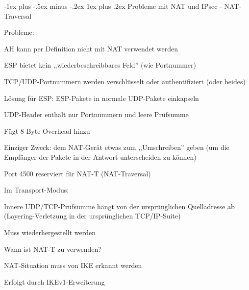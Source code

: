 \documentclass[a4paper]{article}
\makeatletter
\renewcommand{\subsubsection}{\@startsection{subsubsection}{3}{0mm}%
 {-1ex plus -.5ex minus -.2ex}%
 {1ex plus .2ex}%
 {\normalfont\small\bfseries}}
\makeatother
\begin{document}
\begin{multicols}{3}
      \subsubsection{Probleme mit NAT und IPsec - NAT-Traversal}
      \begin{itemize*}
            \item Probleme:
            \begin{itemize*}
                  \item AH kann per Definition nicht mit NAT verwendet werden
                  \item ESP bietet kein ,,wiederbeschreibbares Feld'' (wie Portnummer)
                  \item TCP/UDP-Portnummern werden verschlüsselt oder authentifiziert (oder beides)
            \end{itemize*}
            \item Lösung für ESP: ESP-Pakete in normale UDP-Pakete einkapseln
            \item UDP-Header enthält nur Portnummern und leere Prüfsumme
            \begin{itemize*}
                  \item Fügt 8 Byte Overhead hinzu
                  \item Einziger Zweck: dem NAT-Gerät etwas zum ,,Umschreiben'' geben (um die Empfänger der Pakete in der Antwort unterscheiden zu können)
                  \item Port 4500 reserviert für NAT-T (NAT-Traversal)
            \end{itemize*}
            \item Im Transport-Modus:
            \begin{itemize*}
                  \item Innere UDP/TCP-Prüfsumme hängt von der ursprünglichen Quelladresse ab (Layering-Verletzung in der ursprünglichen TCP/IP-Suite)
                  \item Muss wiederhergestellt werden
            \end{itemize*}
            \item Wann ist NAT-T zu verwenden?
            \begin{itemize*}
                  \item NAT-Situation muss von IKE erkannt werden
                  \item Erfolgt durch IKEv1-Erweiterung

\end{itemize*}
\end{itemize*}
\end{multicols}
\end{document}
